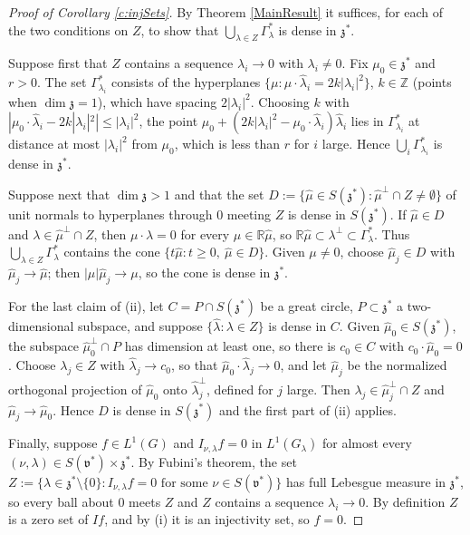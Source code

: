 \documentclass[11pt]{amsart}
\theoremstyle{plain}
\theoremstyle{definition}
\theoremstyle{remark}
\numberwithin{equation}{section}
\def\fz{\mathfrak{z}}
\def\fv{\mathfrak{v}}
\def\mz{\setminus\{0\}}
\def\R{{\mathbb R}}%
\def\Z{{\mathbb Z}}%
\numberwithin{equation}{section}
\begin{document}
\begin{proof}[Proof of Corollary \ref{c:injSets}]
	By Theorem \ref{MainResult} it suffices, for each of the two conditions on $Z$, to show that $\bigcup_{\lambda\in Z}\Gamma_\lambda^*$ is dense in $\fz^*$.

	Suppose first that $Z$ contains a sequence $\lambda_i\to0$ with $\lambda_i\neq0$. Fix $\mu_0\in \fz^*$ and $r>0$. The set $\Gamma_{\lambda_i}^*$ consists of the hyperplanes $\{\mu: \mu\cdot\hat\lambda_i=2k|\lambda_i|^2\}$, $k\in \Z$ (points when $\dim\fz=1$), which have spacing $2|\lambda_i|^2$. Choosing $k$ with $|\mu_0\cdot\hat\lambda_i-2k|\lambda_i|^2|\leq|\lambda_i|^2$, the point $\mu_0+(2k|\lambda_i|^2-\mu_0\cdot\hat\lambda_i)\hat\lambda_i$ lies in $\Gamma_{\lambda_i}^*$ at distance at most $|\lambda_i|^2$ from $\mu_0$, which is less than $r$ for $i$ large. Hence $\bigcup_i\Gamma_{\lambda_i}^*$ is dense in $\fz^*$.

	Suppose next that $\dim\fz>1$ and that the set $D:=\{\hat\mu\in S(\fz^*): \hat\mu^\perp\cap Z\neq\emptyset\}$ of unit normals to hyperplanes through $0$ meeting $Z$ is dense in $S(\fz^*)$. If $\hat\mu\in D$ and $\lambda\in \hat\mu^\perp\cap Z$, then $\mu\cdot\lambda=0$ for every $\mu\in \R\hat\mu$, so $\R\hat\mu\subset\lambda^\perp\subset\Gamma_\lambda^*$. Thus $\bigcup_{\lambda\in Z}\Gamma_\lambda^*$ contains the cone $\{t\hat\mu: t\geq0, \ \hat\mu\in D\}$. Given $\mu\neq0$, choose $\hat\mu_j\in D$ with $\hat\mu_j\to\hat\mu$; then $|\mu|\hat\mu_j\to\mu$, so the cone is dense in $\fz^*$.

	For the last claim of (ii), let $C=P\cap S(\fz^*)$ be a great circle, $P\subset\fz^*$ a two-dimensional subspace, and suppose $\{\hat\lambda: \lambda\in Z\}$ is dense in $C$. Given $\hat\mu_0\in S(\fz^*)$, the subspace $\hat\mu_0^\perp\cap P$ has dimension at least one, so there is $c_0\in C$ with $c_0\cdot\hat\mu_0=0$. Choose $\lambda_j\in Z$ with $\hat\lambda_j\to c_0$, so that $\hat\mu_0\cdot\hat\lambda_j\to0$, and let $\hat\mu_j$ be the normalized orthogonal projection of $\hat\mu_0$ onto $\hat\lambda_j^\perp$, defined for $j$ large. Then $\lambda_j\in \hat\mu_j^\perp\cap Z$ and $\hat\mu_j\to\hat\mu_0$. Hence $D$ is dense in $S(\fz^*)$ and the first part of (ii) applies.

	Finally, suppose $f\in L^1(G)$ and $I_{\nu, \lambda}f=0$ in $L^1(G_\lambda)$ for almost every $(\nu, \lambda)\in S(\fv^*)\times\fz^*$. By Fubini's theorem, the set $Z:=\{\lambda\in \fz^*\mz: I_{\nu, \lambda}f=0 \text{ for some } \nu\in S(\fv^*)\}$ has full Lebesgue measure in $\fz^*$, so every ball about $0$ meets $Z$ and $Z$ contains a sequence $\lambda_i\to 0$. By definition $Z$ is a zero set of $If$, and by (i) it is an injectivity set, so $f=0$.
\end{proof}
\end{document}
